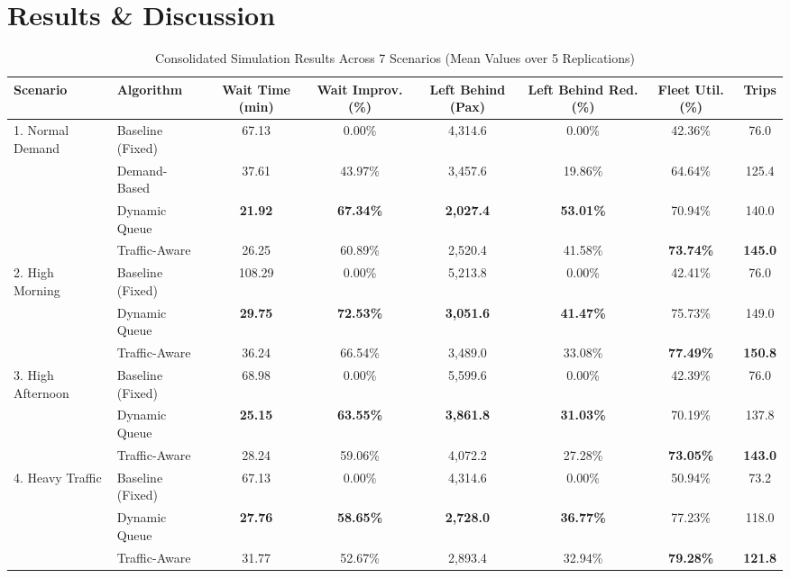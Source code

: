 \documentclass[conference]{IEEEtran}
\begin{document}
\section{Results \& Discussion}

\begin{table}[t]
\centering
\caption{Consolidated Simulation Results Across 7 Scenarios (Mean Values over 5 Replications)}
\label{tab:results}
\begin{tabular}{llcccccc}
\toprule
\textbf{Scenario} & \textbf{Algorithm} & \textbf{Wait Time (min)} & \textbf{Wait Improv. (\%)} & \textbf{Left Behind (Pax)} & \textbf{Left Behind Red. (\%)} & \textbf{Fleet Util. (\%)} & \textbf{Trips} \\
\midrule
1. Normal Demand & Baseline (Fixed) & 67.13 & 0.00\% & 4,314.6 & 0.00\% & 42.36\% & 76.0 \\
                 & Demand-Based     & 37.61 & 43.97\% & 3,457.6 & 19.86\% & 64.64\% & 125.4 \\
                 & Dynamic Queue    & \textbf{21.92} & \textbf{67.34\%} & \textbf{2,027.4} & \textbf{53.01\%} & 70.94\% & 140.0 \\
                 & Traffic-Aware    & 26.25 & 60.89\% & 2,520.4 & 41.58\% & \textbf{73.74\%} & \textbf{145.0} \\
\midrule
2. High Morning  & Baseline (Fixed) & 108.29 & 0.00\% & 5,213.8 & 0.00\% & 42.41\% & 76.0 \\
                 & Dynamic Queue    & \textbf{29.75} & \textbf{72.53\%} & \textbf{3,051.6} & \textbf{41.47\%} & 75.73\% & 149.0 \\
                 & Traffic-Aware    & 36.24 & 66.54\% & 3,489.0 & 33.08\% & \textbf{77.49\%} & \textbf{150.8} \\
\midrule
3. High Afternoon& Baseline (Fixed) & 68.98 & 0.00\% & 5,599.6 & 0.00\% & 42.39\% & 76.0 \\
                 & Dynamic Queue    & \textbf{25.15} & \textbf{63.55\%} & \textbf{3,861.8} & \textbf{31.03\%} & 70.19\% & 137.8 \\
                 & Traffic-Aware    & 28.24 & 59.06\% & 4,072.2 & 27.28\% & \textbf{73.05\%} & \textbf{143.0} \\
\midrule
4. Heavy Traffic & Baseline (Fixed) & 67.13 & 0.00\% & 4,314.6 & 0.00\% & 50.94\% & 73.2 \\
                 & Dynamic Queue    & \textbf{27.76} & \textbf{58.65\%} & \textbf{2,728.0} & \textbf{36.77\%} & 77.23\% & 118.0 \\
                 & Traffic-Aware    & 31.77 & 52.67\% & 2,893.4 & 32.94\% & \textbf{79.28\%} & \textbf{121.8} \\

\end{tabular}
\end{table}
\end{document}
